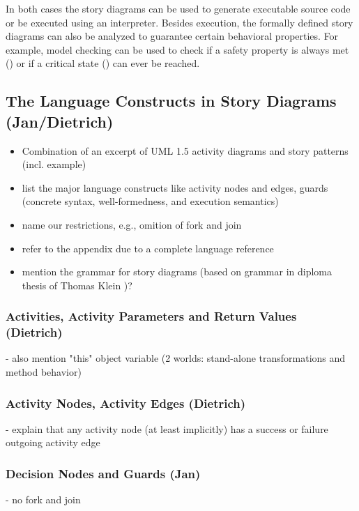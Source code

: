 In both cases the story diagrams can be used to generate executable source code or be executed using an interpreter.
Besides execution, the formally defined story diagrams can also be analyzed to guarantee certain behavioral properties.
For example, model checking can be used to check if a safety property is always met () or if a critical state () can ever be reached.


\subsection{The Language Constructs in Story Diagrams (Jan/Dietrich)}\label{sec:StoryDiagrams:composition}

\begin{itemize}
  \item Combination of an excerpt of UML 1.5 activity diagrams and story patterns (incl. example)
  \item list the major language constructs like activity nodes and edges, guards (concrete syntax, well-formedness, and execution semantics)
  \item name our restrictions, e.g., omition of fork and join
  \item refer to the appendix due to a complete language reference
  \item mention the grammar for story diagrams (based on grammar in diploma thesis of Thomas Klein \cite{Kle99})?
\end{itemize}


\subsubsection{Activities, Activity Parameters and Return Values (Dietrich)}
- also mention "this" object variable (2 worlds: stand-alone transformations and method behavior)

\subsubsection{Activity Nodes, Activity Edges (Dietrich)}
- explain that any activity node (at least implicitly) has a success or failure outgoing activity edge

\subsubsection{Decision Nodes and Guards (Jan)}
- no fork and join

